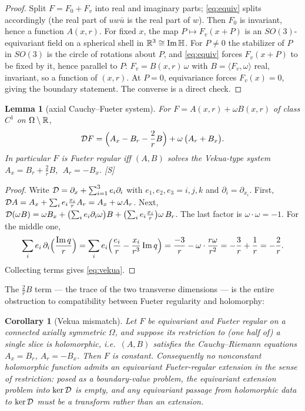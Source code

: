 \documentclass[11pt]{amsart}
\newtheorem{lemma}[theorem]{Lemma}
\newtheorem{corollary}[theorem]{Corollary}
\theoremstyle{definition}
\theoremstyle{remark}
\begin{document}
\begin{proof}
Split $F=F_0+F_v$ into real and imaginary parts; \eqref{eq:equiv} splits
accordingly (the real part of $uw\bar u$ is the real part of $w$).  Then
$F_0$ is invariant, hence a function $A(x,r)$.  For fixed $x$, the map
$P\mapsto F_v(x+P)$ is an $SO(3)$-equivariant field on a spherical shell
in $\mathbb{R}^3\cong\operatorname{Im}\mathbb{H}$.  For $P\neq0$ the stabilizer of $P$ in $SO(3)$ is
the circle of rotations about $P$, and \eqref{eq:equiv} forces $F_v(x+P)$
to be fixed by it, hence parallel to $P$: $F_v=B(x,r)\,\omega$ with
$B=\langle F_v,\omega\rangle$ real, invariant, so a function of $(x,r)$.
At $P=0$, equivariance forces $F_v(x)=0$, giving the boundary statement.
The converse is a direct check.
\end{proof}

\begin{lemma}[axial Cauchy--Fueter system]\label{lem:axialsystem}
For $F=A(x,r)+\omega B(x,r)$ of class $C^1$ on $\Omega\setminus\mathbb{R}$,
\begin{equation}\label{eq:vekua}
\mathcal{D} F=\Bigl(A_x-B_r-\frac{2}{r}B\Bigr)
+\omega\,\bigl(A_r+B_x\bigr).
\end{equation}
In particular $F$ is Fueter regular iff $(A,B)$ solves the Vekua-type
system $A_x=B_r+\tfrac2rB$, $\ A_r=-B_x$.  \textup{[S]}
\end{lemma}

\begin{proof}
Write $\mathcal{D}=\partial_x+\sum_{i=1}^3e_i\partial_i$ with
$e_1,e_2,e_3=i,j,k$ and $\partial_i=\partial_{x_i}$.  First,
$\mathcal{D} A=A_x+\sum_ie_i\tfrac{x_i}{r}A_r=A_x+\omega A_r$.  Next,
$\mathcal{D}(\omega B)=\omega B_x
+\bigl(\sum_ie_i\partial_i\omega\bigr)B
+\bigl(\sum_ie_i\tfrac{x_i}{r}\bigr)\omega\,B_r$.
The last factor is $\omega\cdot\omega=-1$.  For the middle one,
\[
\sum_ie_i\,\partial_i\Bigl(\frac{\operatorname{Im} q}{r}\Bigr)
=\sum_ie_i\Bigl(\frac{e_i}{r}-\frac{x_i}{r^3}\operatorname{Im} q\Bigr)
=\frac{-3}{r}-\omega\cdot\frac{r\omega}{r^2}
=-\frac{3}{r}+\frac{1}{r}=-\frac{2}{r}.
\]
Collecting terms gives \eqref{eq:vekua}.
\end{proof}

The $\tfrac2rB$ term --- the trace of the two transverse dimensions --- is
the entire obstruction to compatibility between Fueter regularity and
holomorphy:

\begin{corollary}[Vekua mismatch]\label{cor:mismatch}
Let $F$ be equivariant and Fueter regular on a connected axially symmetric
$\Omega$, and suppose its restriction to (one half of) a single slice is
holomorphic, i.e.\ $(A,B)$ satisfies the Cauchy--Riemann equations
$A_x=B_r$, $A_r=-B_x$.  Then $F$ is constant.  Consequently \emph{no}
nonconstant holomorphic function admits an equivariant Fueter-regular
extension in the sense of restriction: posed as a boundary-value problem,
the equivariant extension problem into $\ker\mathcal{D}$ is empty, and any
equivariant passage from holomorphic data to $\ker\mathcal{D}$ must be a
\emph{transform} rather than an extension.
\end{corollary}
\end{document}
